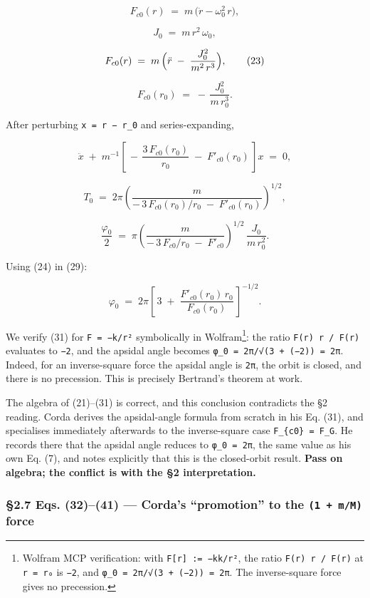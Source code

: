 \documentclass[
  11pt,
]{article}
\begin{document}
\[
F_{c0}(r) \;=\; m\,\bigl(\ddot r - \omega_{0}^{2}\,r\bigr), \tag{21}
\]

\[
J_{0} \;=\; m\,r^{2}\,\omega_{0}, \tag{22}
\]

\[
F_{c0}(r) \;=\; m\,\Bigl(\ddot r \;-\; \frac{J_{0}^{2}}{m^{2}\,r^{3}}\Bigr), \tag{23}
\]

\[
F_{c0}(r_{0}) \;=\; -\,\frac{J_{0}^{2}}{m\,r_{0}^{3}}. \tag{24}
\]

After perturbing \texttt{x\ =\ r\ −\ r\_0} and series-expanding,

\[
\ddot x \;+\; m^{-1}\!\left[\,-\,\frac{3\,F_{c0}(r_{0})}{r_{0}} \;-\; F'_{c0}(r_{0})\,\right] x \;=\; 0, \tag{27}
\]

\[
T_{0} \;=\; 2\pi\!\left(\frac{m}{-\,3\,F_{c0}(r_{0})/r_{0} \;-\; F'_{c0}(r_{0})}\right)^{1/2}, \tag{28}
\]

\[
\frac{\varphi_{0}}{2}
\;=\; \pi\!\left(\frac{m}{-\,3\,F_{c0}/r_{0} \;-\; F'_{c0}}\right)^{1/2}\,\frac{J_{0}}{m\,r_{0}^{2}}. \tag{29}
\]

Using (24) in (29):

\[
\varphi_{0}
\;=\; 2\pi\!\left[\,3 \;+\; \frac{F'_{c0}(r_{0})\,r_{0}}{F_{c0}(r_{0})}\,\right]^{-1/2}. \tag{31}
\]

We verify (31) for \texttt{F\ =\ −k/r²} symbolically in
Wolfram\footnote{Wolfram MCP verification: with
  \texttt{F{[}r{]}\ :=\ −kk/r²}, the ratio
  \texttt{F\textquotesingle{}(r)\ r\ /\ F(r)} at \texttt{r\ =\ r₀} is
  \texttt{−2}, and \texttt{φ\_0\ =\ 2π/√(3\ +\ (−2))\ =\ 2π}. The
  inverse-square force gives no precession.}: the ratio
\texttt{F\textquotesingle{}(r)\ r\ /\ F(r)} evaluates to \texttt{−2},
and the apsidal angle becomes \texttt{φ\_0\ =\ 2π/√(3\ +\ (−2))\ =\ 2π}.
Indeed, for an inverse-square force the apsidal angle is \texttt{2π},
the orbit is closed, and there is no precession. This is precisely
Bertrand's theorem at work.

The algebra of (21)--(31) is correct, and this conclusion contradicts
the §2 reading. Corda derives the apsidal-angle formula from scratch in
his Eq. (31), and specialises immediately afterwards to the
inverse-square case \texttt{F\_\{c0\}\ =\ F\_G}. He records there that
the apsidal angle reduces to \texttt{φ\_0\ =\ 2π}, the same value as his
own Eq. (7), and notes explicitly that this is the closed-orbit result.
\textbf{Pass on algebra; the conflict is with the §2 interpretation.}

\hypertarget{eqs.-3241-cordas-promotion-to-the-1-mm-force}{%
\subsubsection{\texorpdfstring{§2.7 Eqs. (32)--(41) --- Corda's
``promotion'' to the \texttt{(1\ +\ m/M)}
force}{§2.7 Eqs. (32)--(41) --- Corda's ``promotion'' to the (1 + m/M) force}}\label{eqs.-3241-cordas-promotion-to-the-1-mm-force}}
\end{document}
